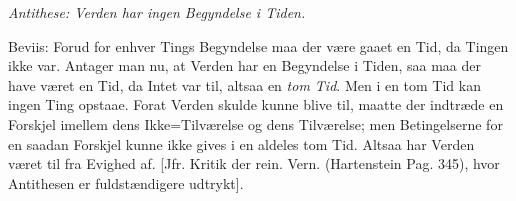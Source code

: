 \documentclass[12pt]{book}
\newcommand{\opage}[1]{\marginnote{\footnotesize\textit{[#1]}}}
\begin{document}
\emph{Antithese: Verden har ingen Begyndelse i Tiden.}

Beviis: Forud for enhver Tings Begyndelse maa der
\opage{123} %
være gaaet en Tid, da Tingen ikke var. Antager man nu, at Verden har en Begyndelse i
Tiden, saa maa der have været en Tid, da Intet var til, altsaa en \emph{tom Tid}. Men
i en tom Tid kan ingen Ting opstaae. Forat Verden skulde kunne blive til, maatte der
indtræde en Forskjel imellem dens Ikke=Tilværelse og dens Tilværelse; men
Betingelserne for en saadan Forskjel kunne ikke gives i en aldeles tom Tid. Altsaa
har Verden været til fra Evighed af. [Jfr. Kritik der rein. Vern. (Hartenstein Pag.
345), hvor Antithesen er fuldstændigere udtrykt].
\end{document}

